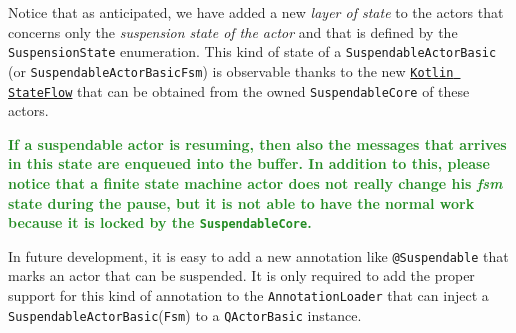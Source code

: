 Notice that as anticipated, we have added a new \textit{layer of state} to the actors that concerns only the \textit{suspension state of the actor} and that is defined by the \texttt{SuspensionState} enumeration.
This kind of state of a \texttt{SuspendableActorBasic} (or \texttt{SuspendableActorBasicFsm}) is observable thanks to the new \href{https://kotlin.github.io/kotlinx.coroutines/kotlinx-coroutines-core/kotlinx.coroutines.flow/-state-flow/}{\texttt{Kotlin StateFlow}} that can be obtained from the owned \texttt{SuspendableCore} of these actors.

\textcolor{ForestGreen}{\textbf{If a suspendable actor is resuming, then also the messages that arrives in this state are enqueued into the buffer. In addition to this, please notice that a finite state machine actor does not really change his \textit{fsm} state during the pause, but it is not able to have the normal work because it is locked by the \texttt{SuspendableCore}.}}

In future development, it is easy to add a new annotation like \texttt{@Suspendable} that marks an actor that can be suspended. It is only required to add the proper support for this kind of annotation to the \texttt{AnnotationLoader} that can inject a \texttt{SuspendableActorBasic}(\texttt{Fsm}) to a \texttt{QActorBasic} instance.